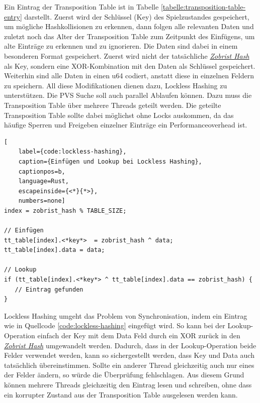 \vspace*{-0.2cm}

Ein Eintrag der Transposition Table ist in Tabelle \ref{tabelle:transposition-table-entry} darstellt. Zuerst wird der Schlüssel (Key) des Spielzustandes gespeichert, um mögliche Hashkollisionen zu erkennen, dann folgen alle relevanten Daten und zuletzt noch das Alter der Transposition Table zum Zeitpunkt des Einfügens, um alte Einträge zu erkennen und zu ignorieren. Die Daten sind dabei in einem besonderen Format gespeichert. Zuerst wird nicht der tatsächliche \hyperref[text:zobrist-hash]{\emph{Zobrist Hash}} als Key, sondern eine \ac{XOR}-Kombination mit den Daten als Schlüssel gespeichert. Weiterhin sind alle Daten in einen \ac{u64} codiert, anstatt diese in einzelnen Feldern zu speichern. All diese Modifikationen dienen dazu, Lockless Hashing zu unterstützen. Die \ac{PVS} Suche soll auch parallel Ablaufen können. Dazu muss die Transposition Table über mehrere Threads geteilt werden. Die geteilte Transposition Table sollte dabei möglichst ohne Locks auskommen, da das häufige Sperren und Freigeben einzelner Einträge ein Performanceoverhead ist.

\begin{lstlisting}[
    label={code:lockless-hashing},
    caption={Einfügen und Lookup bei Lockless Hashing},
    captionpos=b,
    language=Rust,
    escapeinside={<*}{*>},
    numbers=none]
index = zobrist_hash % TABLE_SIZE;

// Einfügen
tt_table[index].<*key*>  = zobrist_hash ^ data;
tt_table[index].data = data;

// Lookup
if (tt_table[index].<*key*> ^ tt_table[index].data == zobrist_hash) {
   // Eintrag gefunden
}
\end{lstlisting}

Lockless Hashing umgeht das Problem von Synchronisation, indem ein Eintrag wie in Quellcode \ref{code:lockless-hashing} eingefügt wird. So kann bei der Lookup-Operation einfach der Key mit dem Data Feld durch ein \ac{XOR} zurück in den \hyperref[text:zobrist-hash]{\emph{Zobrist Hash}} umgewandelt werden. Dadurch, dass in der Lookup-Operation beide Felder verwendet werden, kann so sichergestellt werden, dass Key und Data auch tatsächlich übereinstimmen. Sollte ein anderer Thread gleichzeitig auch nur eines der Felder ändern, so würde die Überprüfung fehlschlagen. Aus diesem Grund können mehrere Threads gleichzeitig den Eintrag lesen und schreiben, ohne dass ein korrupter Zustand aus der Transposition Table ausgelesen werden kann. \cite{2002.LocklessTT}

